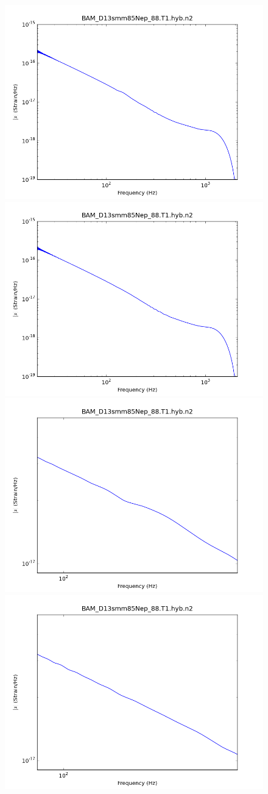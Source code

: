 \begin{figure}
  \includegraphics[width=0.5\linewidth]{figures/ninja2/BAM_D13smm85Nep_88_T1_hyb_n2_amp_old}
  \includegraphics[width=0.5\linewidth]{figures/ninja2/BAM_D13smm85Nep_88_T1_hyb_n2_amp_new} \\
  \includegraphics[width=0.5\linewidth]{figures/ninja2/BAM_D13smm85Nep_88_T1_hyb_n2_amp_old_zoom}
  \includegraphics[width=0.5\linewidth]{figures/ninja2/BAM_D13smm85Nep_88_T1_hyb_n2_amp_new_zoom} \\
  \caption[Frequency-domain hybrid NINJA-2 waveforms]{
}
\end{figure}
